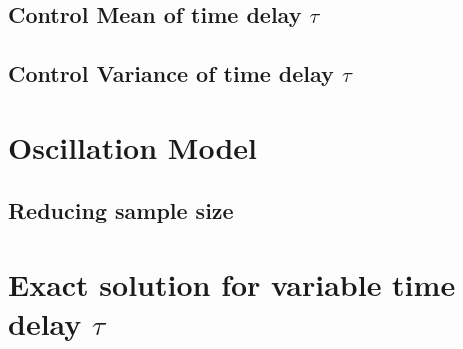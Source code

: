 \documentclass[a4paper,10pt]{article}
\begin{document}
\subsection{Control Mean of time delay $\tau$}

\subsection{Control Variance of time delay $\tau$}

\section{Oscillation Model}

\subsection{Reducing sample size}

\section{Exact solution for variable time delay $\tau$}
\end{document}
